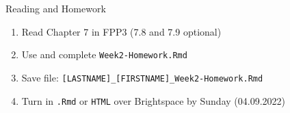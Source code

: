 \documentclass[
  ignorenonframetext,
]{beamer}
\begin{document}
\begin{frame}[fragile]{Reading and Homework}
\protect\hypertarget{reading-and-homework-1}{}
\begin{enumerate}
\item
  Read Chapter 7 in FPP3 (7.8 and 7.9 optional) \newline
\item
  Use and complete \texttt{Week2-Homework.Rmd}
\item
  Save file:
  \texttt{{[}LASTNAME{]}\_{[}FIRSTNAME{]}\_Week2-Homework.Rmd}
\item
  Turn in \texttt{.Rmd} or \texttt{HTML} over Brightspace by Sunday
  (04.09.2022)
\end{enumerate}
\end{frame}
\end{document}
